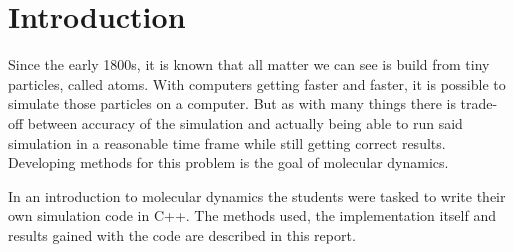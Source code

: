 \chapter{Introduction}
\begin{comment}
- atoms maybe as the first bullet point 1800 know but also the greeks knew, but was kinda forgotten again. Do i need a cite there?! nah
- with stronger computers it became possible to simulate  the atoms, but kinda computationally expensive, methods have to be developed to simplifyc  stuff
- mention like the goal of this, build an own smol simulation
- introduction to md simulation 
- weird mix between chemistry, physics and computation + a lot of programming
- written in c++ instead of the standard python stuff 
- from a developers perspective programming in python will most likely take less time, while programming in be a bit faster (and more complicated)
\end{comment}


Since the early 1800s, it is known that all matter we can see is build from tiny particles, called atoms. With computers getting faster and faster, it is possible to simulate those particles on a computer. But as with many things there is trade-off between accuracy of the simulation and actually being able to run said simulation in a reasonable time frame while still getting correct results. 
Developing methods for this problem is the goal of molecular dynamics. 
\par 
In an introduction to molecular dynamics the students were tasked to write their own simulation code in C++. The methods used, the implementation itself and results gained with the code are described in this report. 